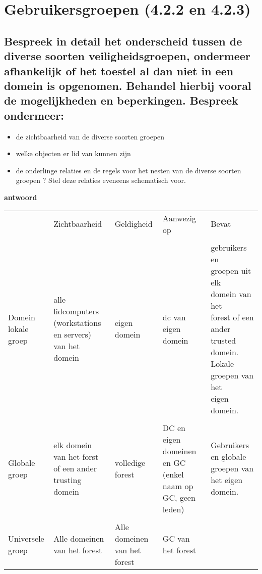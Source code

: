 \chapter{Gebruikersgroepen (4.2.2 en 4.2.3)}
\section{Bespreek in detail het onderscheid tussen de diverse soorten veiligheidsgroepen, ondermeer afhankelijk of het toestel al dan niet in een domein is opgenomen. Behandel hierbij vooral de mogelijkheden en beperkingen. Bespreek ondermeer:}
\begin{itemize}
\item de zichtbaarheid van de diverse soorten groepen
\item welke objecten er lid van kunnen zijn
\item de onderlinge relaties en de regels voor het nesten van de diverse soorten groepen ? Stel deze relaties eveneens schematisch voor.
\end{itemize}

\textbf{antwoord}
\begin{table}[H]
\begin{tabular}{p{3cm}p{3cm}p{3cm}p{3cm}p{3cm}}
 & Zichtbaarheid		& Geldigheid	& Aanwezig op	& Bevat \\
 \\
Domein lokale groep & \parbox{3cm}{alle\\ lidcomputers\\ (workstations\\ en servers)\\ van het domein} & eigen domein                 & \parbox{3cm}{dc van eigen\\ domein}                                      & \parbox{3cm}{gebruikers en\\ groepen uit elk\\ domein van het\\ forest of een\\ ander trusted\\ domein. Lokale\\ groepen van het\\ eigen domein.} \\ \\

Globale groep       & elk domein van het forst of een ander trusting domein      & volledige forest             & DC en eigen domeinen en GC (enkel naam op GC, geen leden) & Gebruikers en globale groepen van het eigen domein.                                                                   \\ \\

Universele groep    & Alle domeinen van het forest                               & Alle domeinen van het forest & GC van het forest                                         &                                                                                                                      
\end{tabular}
\end{table}

